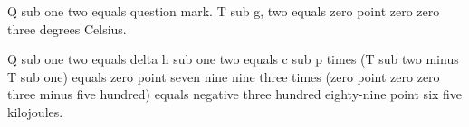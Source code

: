 Q sub one two equals question mark. T sub g, two equals zero point zero zero three degrees Celsius.

Q sub one two equals delta h sub one two equals c sub p times (T sub two minus T sub one) equals zero point seven nine nine three times (zero point zero zero three minus five hundred) equals negative three hundred eighty-nine point six five kilojoules.
